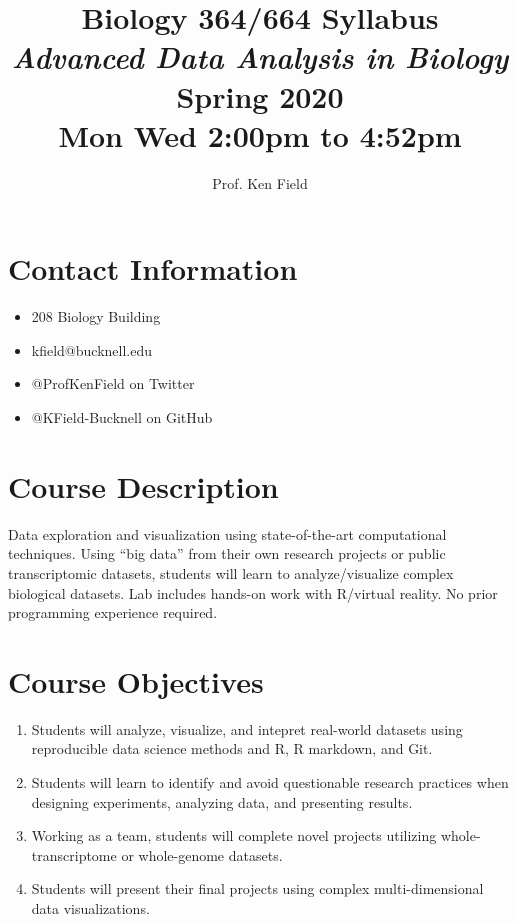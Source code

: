 \documentclass[11pt]{article} %
\title{Biology 364/664 Syllabus \\ \emph{Advanced Data Analysis in Biology} \\ Spring 2020 	\\
Mon Wed 2:00pm to 4:52pm}
\author{Prof. Ken Field}
\begin{document}
\maketitle



\section{Contact Information}
  \begin{itemize}
  	\item 208 Biology Building
  	\item kfield@bucknell.edu
  	\item @ProfKenField on Twitter
  	\item @KField-Bucknell on GitHub
  \end{itemize}
  
  
\section{Course Description}

Data exploration and visualization using state-of-the-art computational techniques. Using “big data” from their own research projects or public transcriptomic datasets, students will learn to analyze/visualize complex biological datasets. Lab includes hands-on work with R/virtual reality. No prior programming experience required.
    
    
\section{Course Objectives}\label{course-objectives}

\begin{enumerate}
\def\labelenumi{\arabic{enumi}.}
\item
  Students will analyze, visualize, and intepret real-world
  datasets using reproducible data science methods and R, R markdown, and Git.
\item
  Students will learn to identify and avoid questionable research practices 
  when designing experiments, analyzing data, and presenting results.
\item
  Working as a team, students will complete novel projects utilizing
  whole-transcriptome or whole-genome datasets.
\item
  Students will present their final projects using complex
  multi-dimensional data visualizations.
\end{enumerate}
\end{document}
